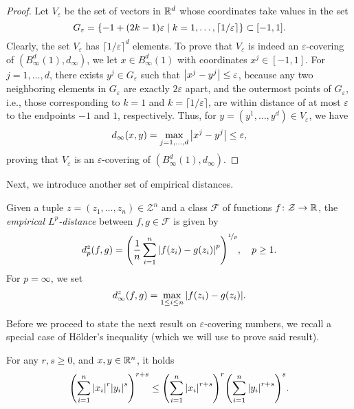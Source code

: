 \begin{proof}
Let $V_{\varepsilon}$ be the set of vectors in $\mathbb{R}^d$ whose coordinates take values in the set
\[
    G_{\varepsilon} = \set{-1 + (2k - 1)\varepsilon \with k = 1, \dots, \lceil 1 / \varepsilon \rceil} \subset [-1, 1].
\]
Clearly, the set $V_{\varepsilon}$ has $\lceil 1 / \varepsilon \rceil^d$ elements. To prove that $V_{\varepsilon}$ is indeed an $\varepsilon$-covering of $(B_{\infty}^d(1), d_{\infty})$, we let $x \in B_{\infty}^d(1)$ with coordinates $x^j \in [-1, 1]$. For $j = 1, \dots, d$, there exists $y^j \in G_{\varepsilon}$ such that $\abs{x^j - y^j} \leq \varepsilon$, because any two neighboring elements in $G_{\varepsilon}$ are exactly $2 \varepsilon$ apart, and the outermost points of $G_{\varepsilon}$, i.e., those corresponding to $k = 1$ and $k = \lceil 1 / \varepsilon \rceil$, are within distance of at most $\varepsilon$ to the endpoints $-1$ and $1$, respectively. Thus, for $y = (y^1, \dots, y^d) \in V_{\varepsilon}$, we have
\[
    d_{\infty}(x, y) = \max_{j = 1, \dots, d} \abs{x^j - y^j} \leq \varepsilon,
\]
proving that $V_{\varepsilon}$ is an $\varepsilon$-covering of $(B_{\infty}^d(1), d_{\infty})$.
\end{proof}

Next, we introduce another set of empirical distances.

\begin{definition}
Given a tuple $z = (z_1, \dots, z_n) \in \mathcal{Z}^n$ and a class $\mathcal{F}$ of functions $f \colon \mathcal{Z} \to \mathbb{R}$, the \emph{empirical $L^p$-distance} between $f, g \in \mathcal{F}$ is given by
\[
    d_p^z(f, g) = \left(\frac{1}{n} \sum_{i=1}^n \abs{f(z_i) - g(z_i)}^p \right)^{\nicefrac{1}{p}}, \quad p \geq 1.
\]
For $p = \infty$, we set
\[
    d_{\infty}^z(f, g) = \max_{1 \leq i \leq n} \abs{f(z_i) - g(z_i)}.
\]
\end{definition}

Before we proceed to state the next result on $\varepsilon$-covering numbers, we recall a special case of H{\"o}lder's inequality (which we will use to prove said result).

\begin{proposition}[H{\"o}lder, 1889]
\label{prop: hoelder}
For any $r, s \geq 0$, and $x, y \in \mathbb{R}^n$, it holds
\[
    \left(\sum_{i=1}^n \abs{x_i}^r \abs{y_i}^s \right)^{r+s} \leq \left(\sum_{i=1}^n \abs{x_i}^{r+s}\right)^r \left(\sum_{i=1}^n \abs{y_i}^{r+s}\right)^s.
\]
\end{proposition}

